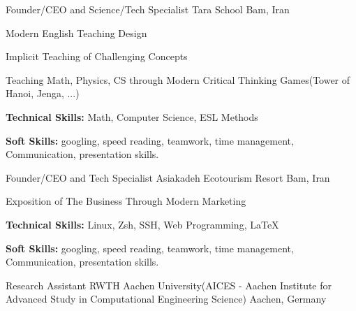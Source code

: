 

\begin{cventries}
  \cventry
    {Founder/CEO and Science/Tech Specialist} %
    {Tara School} %
    {Bam, Iran} %
    {} %
    {
      \begin{cvitems} %
      \item {Modern English Teaching Design}
      \item {Implicit Teaching of Challenging Concepts}
      \item {Teaching Math, Physics, CS through Modern Critical Thinking Games(Tower of Hanoi, Jenga, ...)} 
      \item {\textbf{Technical Skills:} Math, Computer Science, ESL Methods}
      \item {\textbf{Soft Skills:} googling, speed reading, teamwork, time management, Communication, presentation skills.}
      \end{cvitems}
    }
  \cventry
    {Founder/CEO and Tech Specialist} %
    {Asiakadeh Ecotourism Resort} %
    {Bam, Iran} %
    {} %
    {
      \begin{cvitems} %
      \item {Exposition of The Business Through Modern Marketing} 
      \item {\textbf{Technical Skills:} Linux, Zsh, SSH, Web Programming, LaTeX}
      \item {\textbf{Soft Skills:} googling, speed reading, teamwork, time management, Communication, presentation skills.}
      \end{cvitems}
    }
  \cventry
    {Research Assistant} %
    {RWTH Aachen University(AICES - Aachen Institute for Advanced Study in Computational Engineering Science)} %
    {Aachen, Germany} %
    {} %
    {
      \begin{cvitems} %

\end{cvitems}}
\end{cventries}
